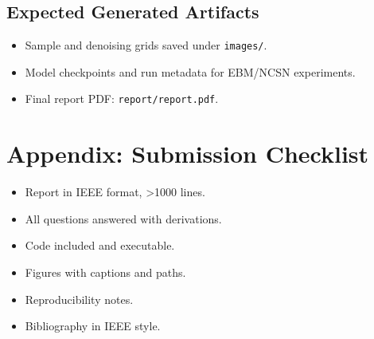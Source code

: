 \documentclass[a4paper,12pt]{article}
\begin{document}
\subsection{Expected Generated Artifacts}
\begin{itemize}
    \item Sample and denoising grids saved under \texttt{images/}.
    \item Model checkpoints and run metadata for EBM/NCSN experiments.
    \item Final report PDF: \texttt{report/report.pdf}.
\end{itemize}

\clearpage
\section{Appendix: Submission Checklist}

\begin{itemize}
    \item Report in IEEE format, >1000 lines.
    \item All questions answered with derivations.
    \item Code included and executable.
    \item Figures with captions and paths.
    \item Reproducibility notes.
    \item Bibliography in IEEE style.
\end{itemize}



\end{document}
